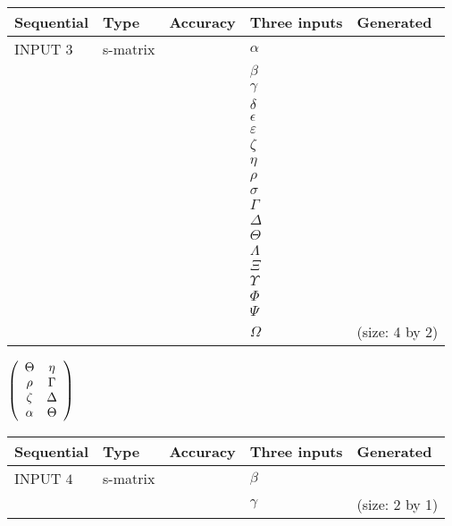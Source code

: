 \documentclass[12pt]{article}
\begin{document}
  
\noindent\begin{tabular}{|l|l|l|l|l|}
\hline
 Sequential & Type & Accuracy & Three inputs & Generated \\ 
\hline
 
 
  INPUT $           3$ & s-matrix & & 
 $  \alpha $ & 
  \\
  & & & 
 $  \beta $ & 
  \\
  & & & 
 $  \gamma $ & 
  \\
  & & & 
 $  \delta $ & 
  \\
  & & & 
 $  \epsilon $ & 
  \\
  & & & 
 $  \varepsilon $ & 
  \\
  & & & 
 $                     \zeta $ & 
  \\
  & & & 
 $  \eta $ & 
  \\
  & & & 
 $  \rho $ & 
  \\
  & & & 
 $  \sigma $ & 
  \\
  & & & 
 $  \Gamma $ & 
  \\
  & & & 
 $  \Delta $ & 
  \\
  & & & 
 $  \Theta $ & 
  \\
  & & & 
 $  \Lambda $ & 
  \\
  & & & 
 $                     \Xi $ & 
  \\
  & & & 
 $  \Upsilon $ & 
  \\
  & & & 
 $  \Phi $ & 
  \\
  & & & 
 $  \Psi $ & 
  \\
  & & & 
 $  \Omega $ & 
  (size:           4 by           2)
 \\  \hline  
 \end{tabular}
   
   
 $  \left( \begin{array}
 {
 c
 c
 }
 \Theta & 
 \eta \\ 
 \rho & 
 \Gamma \\ 
                    \zeta & 
 \Delta \\ 
 \alpha & 
 \Theta
 \end{array} \right) $ 
  
  
\noindent\begin{tabular}{|l|l|l|l|l|}
\hline
 Sequential & Type & Accuracy & Three inputs & Generated \\ 
\hline
 
 
  INPUT $           4$ & s-matrix & & 
 $  \beta $ & 
  \\
  & & & 
 $  \gamma $ & 
  (size:           2 by           1)
 \\  \hline  
 \end{tabular}
   
\end{document}
